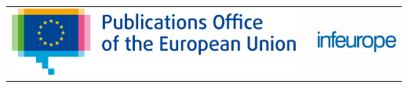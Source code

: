 \pagestyle{empty}
\begin{titlepage}
	\begin{center}

		\begin{center}
			\begin{center}
				\setlength{\tabcolsep}{0pt}
				
				\begin{tabular}{>{\raggedleft}m{3.5cm}>{\centering}m{\dimexpr\textwidth - 8cm\relax}>{\raggedright}m{3.5cm}}
					\includegraphics[width=1.5\linewidth]{images/logos/EU-OP.png}	
					&%
					&%
					\includegraphics[width=\linewidth]{images/logos/infeurope-blue-logo} %
				\end{tabular}
			\end{center}


			\vspace{2mm}

		\end{center}
		\vspace{5cm}
		\textbf{{\large \DelInitiative\\}}
		\vspace{2cm}

		\begin{spacing}{2.5}
			\textbf{\Huge \DelTitle}\\ \vspace{2cm}
		\end{spacing}

		\vspace*{\fill}


	\end{center}
\end{titlepage}

